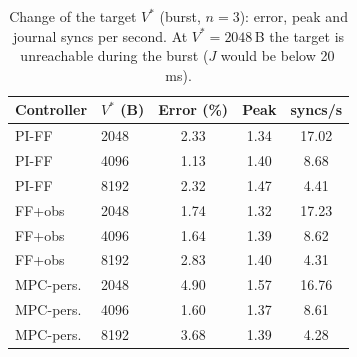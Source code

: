 \begin{table}[t]\centering\small
\caption{Change of the target $V^*$ (burst, $n=3$): error, peak and journal syncs per second. At $V^*=2048$\,B the target is unreachable during the burst ($J$ would be below 20\,ms).}\label{tab:vstar}
\begin{tabular}{llccc}\toprule
Controller & $V^*$ (B) & Error (\%) & Peak & syncs/s\\\midrule
PI-FF & 2048 & 2.33 & 1.34 & 17.02\\
PI-FF & 4096 & 1.13 & 1.40 & 8.68\\
PI-FF & 8192 & 2.32 & 1.47 & 4.41\\
FF+obs & 2048 & 1.74 & 1.32 & 17.23\\
FF+obs & 4096 & 1.64 & 1.39 & 8.62\\
FF+obs & 8192 & 2.83 & 1.40 & 4.31\\
MPC-pers. & 2048 & 4.90 & 1.57 & 16.76\\
MPC-pers. & 4096 & 1.60 & 1.37 & 8.61\\
MPC-pers. & 8192 & 3.68 & 1.39 & 4.28\\
\bottomrule\end{tabular}\end{table}
